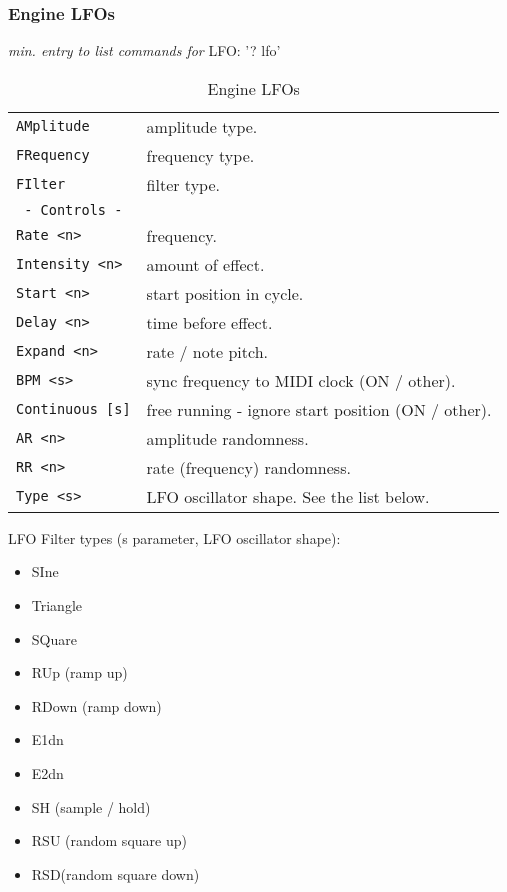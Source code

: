 \subsubsection{Engine LFOs}
\label{subsec:command_line_engine_lfos}
   \textsl{min. entry to list commands for} LFO: '? lfo'
   \begin{table}[H]
      \centering
      \caption{Engine LFOs}
      \label{table:yoshimi_engine_lfos}
      \begin{tabular}{l l}

\texttt{AMplitude} &
   amplitude type. \\
\texttt{FRequency} &
   frequency type. \\
\texttt{FIlter} &
   filter type. \\
\texttt{ - Controls - } & \\
\texttt{Rate <n>} &
   frequency. \\
\texttt{Intensity <n>} &
   amount of effect. \\
\texttt{Start <n>} &
   start position in cycle. \\
\texttt{Delay <n>} &
   time before effect. \\
\texttt{Expand <n>} &
   rate / note pitch. \\
\texttt{BPM <s>} &
   sync frequency to MIDI clock (ON / other). \\
\texttt{Continuous [s]} &
   free running - ignore start position (ON / other). \\
\texttt{AR <n>} &
   amplitude randomness. \\
\texttt{RR <n>} &
   rate (frequency) randomness. \\
\texttt{Type <s>} &
   LFO oscillator shape. See the list below. \\

      \end{tabular}
   \end{table}

LFO Filter types (s parameter, LFO oscillator shape):

   \begin{itemize}
      \item SIne
      \item Triangle
      \item SQuare
      \item RUp (ramp up)
      \item RDown (ramp down)
      \item E1dn
      \item E2dn
      \item SH (sample / hold)
      \item RSU (random square up)
      \item RSD(random square down)
   \end{itemize}

